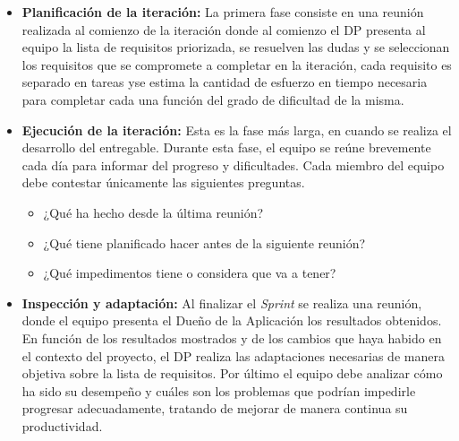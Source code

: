 \begin{itemize}
\item \textbf{Planificación de la iteración:} La primera fase consiste en una reunión realizada al comienzo de la iteración donde al comienzo el DP presenta al equipo la lista de requisitos priorizada, se resuelven las dudas y se seleccionan los requisitos que se compromete a completar en la iteración, cada requisito es separado en tareas  yse estima la cantidad de esfuerzo en tiempo necesaria para completar cada una función del grado de dificultad de la misma.

\item \textbf{Ejecución de la iteración:} Esta es la fase más larga, en cuando se realiza el desarrollo del entregable. Durante esta fase, el equipo se reúne brevemente cada día para informar del progreso y dificultades. Cada miembro del equipo debe contestar únicamente las siguientes preguntas.
\begin{itemize}
\item ¿Qué ha hecho desde la última reunión?
\item ¿Qué tiene planificado hacer antes de la siguiente reunión?
\item ¿Qué impedimentos tiene o considera que va a tener?
\end{itemize}

\item \textbf{Inspección y adaptación:} Al finalizar el \textit{Sprint} se realiza una reunión, donde el equipo presenta el Dueño de la Aplicación los resultados obtenidos. En función de los resultados mostrados y de los cambios que haya habido en el contexto del proyecto, el DP realiza las adaptaciones necesarias de manera objetiva sobre la lista de requisitos. Por último el equipo debe analizar cómo ha sido su desempeño y cuáles son los problemas que podrían impedirle progresar adecuadamente, tratando de mejorar de manera continua su productividad.

\end{itemize}








 
